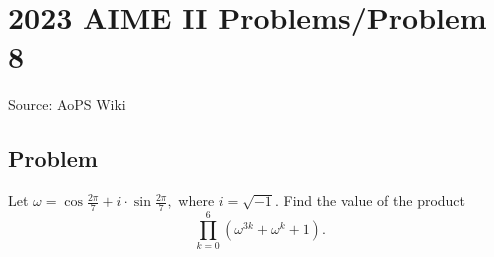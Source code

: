 \documentclass[12pt]{article}
\begin{document}
\section*{{2023 AIME II Problems/Problem 8}}
Source: AoPS Wiki

\subsection*{Problem}
Let $\omega = \cos\frac{2\pi}{7} + i \cdot \sin\frac{2\pi}{7},$ where $i = \sqrt{-1}.$ Find the value of the product \[\prod_{k=0}^6 \left(\omega^{3k} + \omega^k + 1\right).\]
\end{document}
